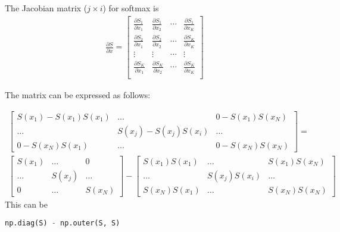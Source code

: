 \begin{appendices}
The Jacobian matrix ($j\times i$) for softmax is 
\begin{align*}
	\frac{\partial S}{\partial x} =
\begin{bmatrix}
\frac{\partial S_{1}}{\partial x_{1}} & \frac{\partial S_{1}}{\partial x_{2}} & \cdots & \frac{\partial S_{1}}{\partial x_{K}} \\
\frac{\partial S_{2}}{\partial x_{1}} & \frac{\partial S_{2}}{\partial x_{2}} & \cdots & \frac{\partial S_{K}}{\partial x_{K}} \\
\vdots & \vdots & \cdots & \vdots \\
\frac{\partial S_{K}}{\partial x_{1}} & \frac{\partial S_{K}}{\partial x_{2}} & \cdots & \frac{\partial S_{K}}{\partial x_{K}} \\
	\end{bmatrix}
\end{align*}

The matrix can be expressed as follows:

\begin{align*}
\begin{bmatrix}
	S(x_1)-S(x_1)S(x_1) & \ldots & 0-S(x_1)S(x_N)\\
	\ldots & S(x_j)-S(x_j)S(x_i) & \ldots\\
	0-S(x_N)S(x_1)& \ldots & 0-S(x_N)S(x_N)
\end{bmatrix} =  \\
\begin{bmatrix}
	S(x_1) & \ldots & 0\\
	\ldots & S(x_j) & \ldots\\
	0& \ldots & S(x_N)
\end{bmatrix} - 
\begin{bmatrix}
	S(x_1)S(x_1) & \ldots & S(x_1)S(x_N)\\
	\ldots & S(x_j)S(x_i) & \ldots\\
	S(x_N)S(x_1)& \ldots & S(x_N)S(x_N)
\end{bmatrix}
\end{align*}
This can be 

\begin{lstlisting}[language=Python]
np.diag(S) - np.outer(S, S)
\end{lstlisting}



\end{appendices}

